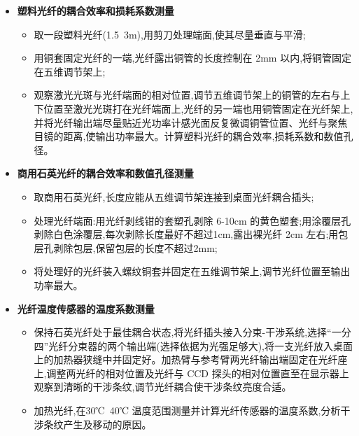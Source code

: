 \documentclass[12pt, a4paper]{article}
\begin{document}
\begin{enumerate}
\begin{itemize}
       \item \textbf{塑料光纤的耦合效率和损耗系数测量}
            \begin{itemize}
                 \item 取一段塑料光纤(1.5~3m),用剪刀处理端面,使其尽量垂直与平滑;
                 \item 用铜套固定光纤的一端,光纤露出铜管的长度控制在 2mm 以内,将铜管固定在五维调节架上;
                  \item 观察激光光斑与光纤端面的相对位置,调节五维调节架上的铜管的左右与上下位置至激光光斑打在光纤端面上,光纤的另一端也用铜管固定在光纤架上,并将光纤输出端尽量贴近光功率计感光面反复微调铜管位置、光纤与聚焦目镜的距离,使输出功率最大。计算塑料光纤的耦合效率,损耗系数和数值孔径。
           \end{itemize}
        \item \textbf{商用石英光纤的耦合效率和数值孔径测量}
        \begin{itemize}
            \item 取商用石英光纤,长度应能从五维调节架连接到桌面光纤耦合插头;
            \item 处理光纤端面:用光纤剥线钳的套塑孔剥除 6-10cm 的黄色塑套;用涂覆层孔剥除白色涂覆层,每次剥除长度最好不超过1cm,露出裸光纤 2cm 左右;用包层孔剥除包层,保留包层的长度不超过2mm;
             \item 将处理好的光纤装入螺纹铜套并固定在五维调节架上,调节光纤位置至输出功率最大。
         \end{itemize}
         \item \textbf{光纤温度传感器的温度系数测量}
           \begin{itemize}
             \item 保持石英光纤处于最佳耦合状态,将光纤插头接入分束-干涉系统,选择“一分四”光纤分束器的两个输出端(选择依据为光强足够大),将一支光纤放入桌面上的加热器狭缝中并固定好。加热臂与参考臂两光纤输出端固定在光纤座上,调整两光纤的相对位置及光纤与 CCD 探头的相对位置直至在显示器上观察到清晰的干涉条纹,调节光纤耦合使干涉条纹亮度合适。
             \item 加热光纤,在30℃~40℃ 温度范围测量并计算光纤传感器的温度系数,分析干涉条纹产生及移动的原因。
           \end{itemize}
    \end{itemize}

\end{enumerate}
\end{document}
